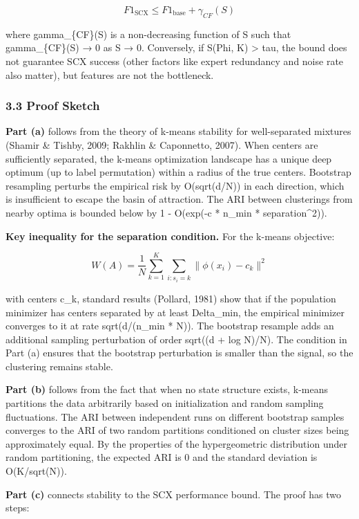 \documentclass[
  12pt,
]{article}
\begin{document}
\[F1_{\text{SCX}} \leq F1_{\text{base}} + \gamma_{CF}(S)\]

where gamma\_\{CF\}(S) is a non-decreasing function of S such that
gamma\_\{CF\}(S) → 0 as S → 0. Conversely, if S(Phi, K) \textgreater{}
tau, the bound does not guarantee SCX success (other factors like expert
redundancy and noise rate also matter), but features are not the
bottleneck.

\subsubsection{3.3 Proof Sketch}\label{proof-sketch}

\textbf{Part (a)} follows from the theory of k-means stability for
well-separated mixtures (Shamir \& Tishby, 2009; Rakhlin \& Caponnetto,
2007). When centers are sufficiently separated, the k-means optimization
landscape has a unique deep optimum (up to label permutation) within a
radius of the true centers. Bootstrap resampling perturbs the empirical
risk by O(sqrt(d/N)) in each direction, which is insufficient to escape
the basin of attraction. The ARI between clusterings from nearby optima
is bounded below by 1 - O(exp(-c * n\_min * separation\^{}2)).

\textbf{Key inequality for the separation condition.} For the k-means
objective:

\[W(A) = \frac{1}{N} \sum_{k=1}^K \sum_{i: s_i = k} \|\phi(x_i) - c_k\|^2\]

with centers c\_k, standard results (Pollard, 1981) show that if the
population minimizer has centers separated by at least Delta\_min, the
empirical minimizer converges to it at rate sqrt(d/(n\_min * N)). The
bootstrap resample adds an additional sampling perturbation of order
sqrt((d + log N)/N). The condition in Part (a) ensures that the
bootstrap perturbation is smaller than the signal, so the clustering
remains stable.

\textbf{Part (b)} follows from the fact that when no state structure
exists, k-means partitions the data arbitrarily based on initialization
and random sampling fluctuations. The ARI between independent runs on
different bootstrap samples converges to the ARI of two random
partitions conditioned on cluster sizes being approximately equal. By
the properties of the hypergeometric distribution under random
partitioning, the expected ARI is 0 and the standard deviation is
O(K/sqrt(N)).

\textbf{Part (c)} connects stability to the SCX performance bound. The
proof has two steps:
\end{document}
